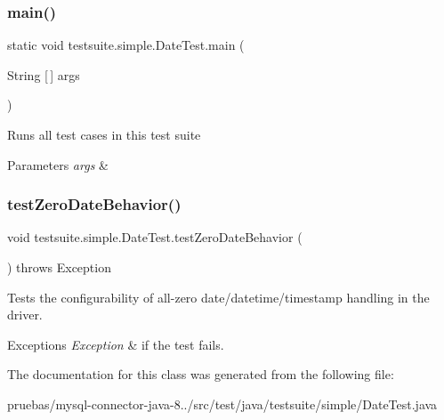 \subsubsection{\texorpdfstring{main()}{main()}}
{\footnotesize\ttfamily static void testsuite.\+simple.\+Date\+Test.\+main (\begin{DoxyParamCaption}\item[{String \mbox{[}$\,$\mbox{]}}]{args }\end{DoxyParamCaption})\hspace{0.3cm}{\ttfamily [static]}}

Runs all test cases in this test suite


\begin{DoxyParams}{Parameters}
{\em args} & \\
\hline
\end{DoxyParams}
\mbox{\label{classtestsuite_1_1simple_1_1_date_test_a65e40a7db246ac9e6d412004a72e4bd4}} 
\subsubsection{\texorpdfstring{test\+Zero\+Date\+Behavior()}{testZeroDateBehavior()}}
{\footnotesize\ttfamily void testsuite.\+simple.\+Date\+Test.\+test\+Zero\+Date\+Behavior (\begin{DoxyParamCaption}{ }\end{DoxyParamCaption}) throws Exception}

Tests the configurability of all-\/zero date/datetime/timestamp handling in the driver.


\begin{DoxyExceptions}{Exceptions}
{\em Exception} & if the test fails. \\
\hline
\end{DoxyExceptions}


The documentation for this class was generated from the following file\+:\begin{DoxyCompactItemize}
\item 
pruebas/mysql-\/connector-\/java-\/8../src/test/java/testsuite/simple/Date\+Test.\+java\end{DoxyCompactItemize}
